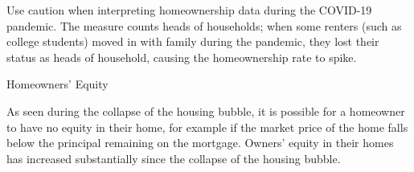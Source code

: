 \begin{minipage}{0.76\textwidth}
\small Use caution when interpreting homeownership data during the COVID-19 pandemic. The measure counts heads of households; when some renters (such as college students) moved in with family during the pandemic, they lost their status as heads of household, causing the homeownership rate to spike. 
\vspace{3.5mm}

\normalsize Homeowners' Equity
\vspace*{-0.5mm}

\small As seen during the collapse of the housing bubble, it is possible for a homeowner to have no equity in their home, for example if the market price of the home falls below the principal remaining on the mortgage. Owners' equity in their homes has increased substantially since the collapse of the housing bubble. 
\end{minipage}
\vspace*{0.5mm}

\begin{minipage}[t]{0.28\textwidth}
\vspace{0pt}
\small 
\end{minipage}\hspace{5mm}
\begin{minipage}[t]{0.44\textwidth} 
\vspace{0pt}
\\
\end{minipage}
\newpage


